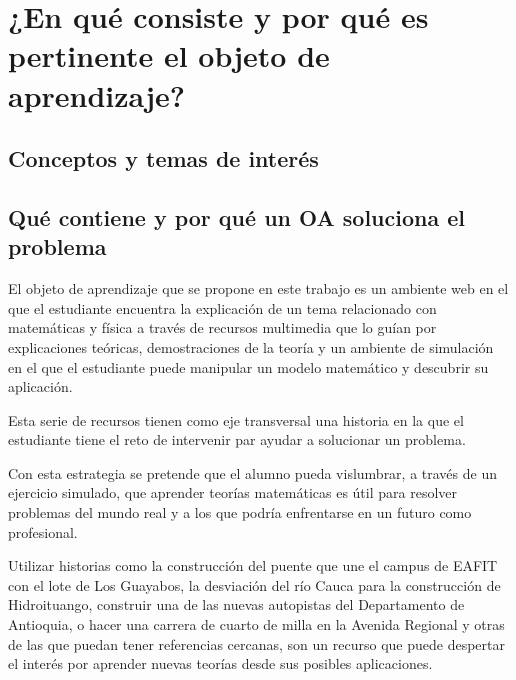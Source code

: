 \documentclass[twoside,letterpaper,11pt]{report}
\begin{document}

\section{¿En qué consiste y por qué es pertinente el objeto de aprendizaje?} %
\label{sec:_en_qu_consiste_y_por_qu_es_pertinente_el_objeto_de_aprendizaje_}

\subsection{Conceptos y temas de interés} %
\label{sub:conceptos_y_temas_de_inter_s}


\subsection{Qué contiene y por qué un OA soluciona el problema} %
\label{sub:qu_contiene_y_por_qu_un_oa_soluciona_el_problema}

El objeto de aprendizaje que se propone en este trabajo es un ambiente web en el que el estudiante encuentra la explicación de un tema relacionado con matemáticas y física a través de recursos multimedia que lo guían por explicaciones teóricas, demostraciones de la teoría y un ambiente de simulación en el que el estudiante puede manipular un modelo matemático y descubrir su aplicación.

Esta serie de recursos tienen como eje transversal una historia en la que el estudiante tiene el reto de intervenir par ayudar a solucionar un problema.

Con esta estrategia se pretende que el alumno pueda vislumbrar, a través de un ejercicio simulado, que aprender teorías matemáticas es útil para resolver problemas del mundo real y a los que podría enfrentarse en un futuro como profesional.

Utilizar historias como la construcción del puente que une el campus de EAFIT con el lote de Los Guayabos, la desviación del río Cauca para la construcción de Hidroituango, construir una de las nuevas autopistas del Departamento de Antioquia, o hacer una carrera de cuarto de milla en la Avenida Regional y otras de las que puedan tener referencias cercanas, son un recurso que puede despertar el interés por aprender nuevas teorías desde sus posibles aplicaciones.  

\end{document}
